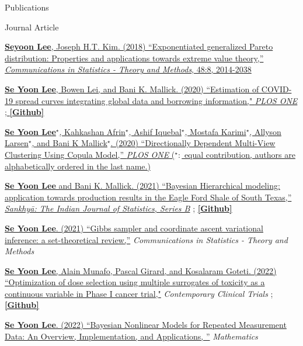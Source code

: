 \documentclass{resume} %
\begin{document}
\begin{rSection}{Publications}
\begin{rSubsection}{Journal Article}{}{}{}
\item[] [1] \href{https://www.tandfonline.com/doi/pdf/10.1080/03610926.2018.1441418?needAccess=true}
{\underline{\textbf{Seyoon Lee}}, Joseph H.T. Kim. (2018) ``Exponentiated generalized Pareto distribution:
Properties and applications towards extreme
value theory,''
\textit{Communications in Statistics - Theory and Methods},
 48:8, 2014-2038}
\item[] [2] \href{https://journals.plos.org/plosone/article?id=10.1371/journal.pone.0236860}
{\underline{\textbf{Se Yoon Lee}}, Bowen Lei, and Bani K. Mallick. (2020)
``Estimation of COVID-19 spread curves integrating global data and borrowing information," \textit{PLOS ONE}
;
\href{https://github.com/StevenBoys/BHRM}{\underline{\textbf{[Github]}}}
}
\item[] [3] 
\href{https://journals.plos.org/plosone/article?id=10.1371/journal.pone.0238996}
{\underline{\textbf{Se Yoon Lee}}$^\star$, Kahkashan Afrin$^\star$, Ashif Iquebal$^\star$, Mostafa Karimi$^\star$, Allyson Larsen$^\star$, and Bani K Mallick$^\star$. (2020)
``Directionally Dependent Multi-View Clustering Using Copula Model,'' \textit{PLOS ONE} ($^\star:$ equal contribution, authors are alphabetically ordered in the last name.)}
\item[] [4]
\href{https://rdcu.be/ceg4p}
{\underline{\textbf{Se Yoon Lee}} and Bani K. Mallick. (2021)
``Bayesian Hierarchical modeling: application towards
production results in the Eagle Ford Shale of South Texas,'' \textit{Sankhyā: The Indian Journal of Statistics, Series B}}
;
\href{https://github.com/yain22/SWM}{\underline{\textbf{[Github]}}}
\item[] [5]
\href{https://www.tandfonline.com/doi/full/10.1080/03610926.2021.1921214?src=}
{\underline{\textbf{Se Yoon Lee}}. (2021)
``Gibbs sampler and coordinate ascent variational inference: a set-theoretical review,''}
\textit{Communications in Statistics - Theory and Methods}
\item[][6]
\href{https://www.sciencedirect.com/science/article/pii/S1551714421003931}
{\underline{\textbf{Se Yoon Lee}}, Alain Munafo, Pascal Girard, and Kosalaram Goteti. (2022)
``Optimization of dose selection using multiple surrogates of toxicity as a continuous variable in Phase I cancer trial,"}
\textit{Contemporary Clinical Trials} 
;
\href{https://github.com/yain22/2PLD}{\underline{\textbf{[Github]}}}
\item[] [7]
\href{https://www.mdpi.com/2227-7390/10/6/898}
{\underline{\textbf{Se Yoon Lee}}. (2022)
``Bayesian Nonlinear Models for Repeated Measurement Data: An Overview, Implementation, and Applications, ''} \textit{Mathematics} 
\end{rSubsection}


\end{rSection}
\end{document}
